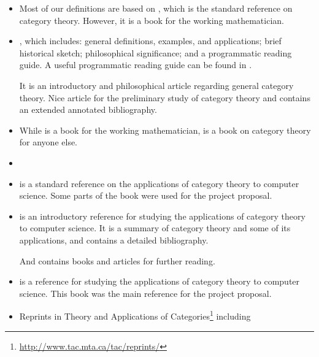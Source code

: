 \begin{itemize}
\item
  Most of our definitions are based on \parencite{maclane-1998}, which
  is the standard reference on category theory. However, it is a book
  for the working mathematician.

\item
  \parencite{marquis-2013}, which includes: general definitions,
  examples, and applications; brief historical sketch; philosophical
  significance; and a programmatic reading guide. A useful
  programmatic reading guide can be found in
  \parencite[48--56]{marquis-2013}.

  It is an introductory and philosophical article regarding general
  category theory. Nice article for the preliminary study of category
  theory and contains an extended annotated bibliography.

\item
  While \parencite{maclane-1998} is a book for the working
  mathematician, \parencite{awodey-2010} is a book on category theory
  for anyone else.

\item
  \parencites{eilenberg-maclane-1942}{eilenberg-maclane-1945}

\item
  \parencite{bird-demoor-1997} is a standard reference on the
  applications of category theory to computer science. Some parts of
  the book were used for the project proposal.

\item
  \parencite{pierce-1991} is an introductory reference for studying
  the applications of category theory to computer science. It is a
  summary of category theory and some of its applications, and
  contains a detailed bibliography.

  And \parencite[§ 4]{pierce-1991} contains books and articles for
  further reading.

\item
  \parencite{poigne-1992} is a reference for studying the applications
  of category theory to computer science. This book was the main
  reference for the project proposal.

\item
  Reprints in Theory and Applications of
  Categories\footnote{\url{http://www.tac.mta.ca/tac/reprints/}}
  including
  \parencites{adamek-et-al-2006}{barr-wells-2005}{barr-wells-2012}

\end{itemize}

